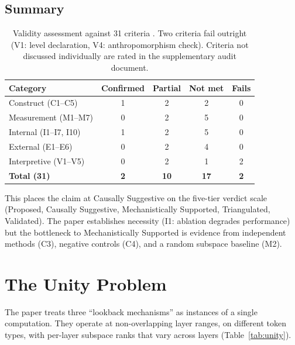 \documentclass[11pt]{article}
\begin{document}
\subsection{Summary}

\begin{table}[t]
\centering
\caption{Validity assessment against 31 criteria \citep{tower2026mechval}. Two criteria fail outright (V1: level declaration, V4: anthropomorphism check). Criteria not discussed individually are rated in the supplementary audit document.}
\label{tab:validity}
\begin{tabular}{lcccc}
\toprule
Category & Confirmed & Partial & Not met & Fails \\
\midrule
Construct (C1--C5) & 1 & 2 & 2 & 0 \\
Measurement (M1--M7) & 0 & 2 & 5 & 0 \\
Internal (I1--I7, I10) & 1 & 2 & 5 & 0 \\
External (E1--E6) & 0 & 2 & 4 & 0 \\
Interpretive (V1--V5) & 0 & 2 & 1 & 2 \\
\midrule
\textbf{Total (31)} & \textbf{2} & \textbf{10} & \textbf{17} & \textbf{2} \\
\bottomrule
\end{tabular}
\end{table}

This places the claim at Causally Suggestive on the five-tier verdict scale (Proposed, Causally Suggestive, Mechanistically Supported, Triangulated, Validated). The paper establishes necessity (I1: ablation degrades performance) but the bottleneck to Mechanistically Supported is evidence from independent methods (C3), negative controls (C4), and a random subspace baseline (M2).


\section{The Unity Problem}
\label{sec:unity}

The paper treats three ``lookback mechanisms'' as instances of a single computation. They operate at non-overlapping layer ranges, on different token types, with per-layer subspace ranks that vary across layers (Table~\ref{tab:unity}).
\end{document}
